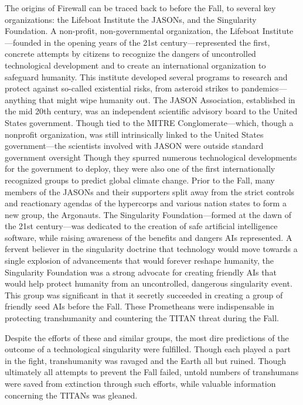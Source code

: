 The origins of Firewall can be traced back to before the Fall, to several key organizations: the Lifeboat Institute the JASONs, and the Singularity Foundation. A non-profit, non-governmental organization, the Lifeboat Institute—founded in the opening years of the 21st century—represented the first, concrete attempts by citizens to recognize the dangers of uncontrolled technological development and to create an international organization to safeguard humanity. This institute developed several programs to research and protect against so-called existential risks, from asteroid strikes to pandemics—anything that might wipe humanity out. The JASON Association, established in the mid 20th century, was an independent scientific advisory board to the United States government. Though tied to the MITRE Conglomerate—which, though a nonprofit organization, was still intrinsically linked to the United States government—the scientists involved with JASON were outside standard government oversight Though they spurred numerous technological developments for the government to deploy, they were also one of the first internationally recognized groups to predict global climate change. Prior to the Fall, many members of the JASONs and their supporters split away from the strict controls and reactionary agendas of the hypercorps and various nation states to form a new group, the Argonauts. The Singularity Foundation—formed at the dawn of the 21st century—was dedicated to the creation of safe artificial intelligence software, while raising awareness of the benefits and dangers AIs represented. A fervent believer in the singularity doctrine that technology would move towards a single explosion of advancements that would forever reshape humanity, the Singularity Foundation was a strong advocate for creating friendly AIs that would help protect humanity from an uncontrolled, dangerous singularity event. This group was significant in that it secretly succeeded in creating a group of friendly seed AIs before the Fall. These Prometheans were indispensable in protecting transhumanity and countering the TITAN threat during the Fall. 

Despite the efforts of these and similar groups, the most dire predictions of the outcome of a technological singularity were fulfilled. Though each played a part in the fight, transhumanity was ravaged and the Earth all but ruined. Though ultimately all attempts to prevent the Fall failed, untold numbers of transhumans were saved from extinction through such efforts, while valuable information concerning the TITANs was gleaned. 

